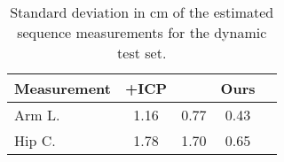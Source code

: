 \begin{table}[h!]
\footnotesize
\begin{center}
\caption{Standard deviation in cm of the estimated sequence measurements for the dynamic test set.}
\label{tab:dyna-res}
\begin{tabular}{|l|c|c|c|c|}
\hline
 Measurement    & \cite{metric-regression-forests-for-human-pose-estim}+ICP & \cite{efficient-model-free-anthropometry-from-depth-data} & Ours \\  \hline
Arm L. & 1.16     & 0.77      &  0.43    \\
Hip C. & 1.78     & 1.70      &   0.65    \\ \hline 
\end{tabular}
\end{center}
\end{table}